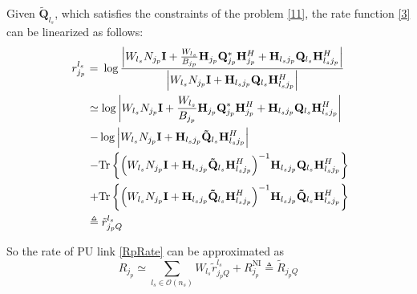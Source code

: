\documentclass[12pt,onecolumn,tworows]{IEEEtran}
\begin{document}
Given $\tilde{\mathbf{Q}}_{l_s}$, which satisfies the constraints of the problem \eqref{11},  the rate function \eqref{3} can be linearized as follows\cite{RuiZhangICL2012}:
 \begin{equation}\label{4}
\begin{gathered}
  {\text{ }}{r_{{j_p}}^{l_s}}{\text{ = }}\log \frac{{\left| {{{W_{{l_s}}}{N_{{j_p}}}}{\mathbf{I}} + {\frac{{{W_{{l_s}}}}}{{{B_{{j_p}}}}}} {{\mathbf{H}}_{{j_p}}}{\mathbf{Q}}_{{j_p}}^*{\mathbf{H}}_{{j_p}}^H + {{\mathbf{H}}_{{l_s}{j_p}}}{{\mathbf{Q}}_{{l_s}}}{\mathbf{H}}_{{l_s}{j_p}}^H} \right|}}{{\left| {{{W_{{l_s}}}{N_{{j_p}}}}{\mathbf{I}} + {{\mathbf{H}}_{{l_s}{j_p}}}{{\mathbf{Q}}_{{l_s}}}{\mathbf{H}}_{{l_s}{j_p}}^H} \right|}} \hfill \\
  \;\;\;\;\;\;\; \simeq \log \left| {{{W_{{l_s}}}{N_{{j_p}}}}{\mathbf{I}} + {\frac{{{W_{{l_s}}}}}{{{B_{{j_p}}}}}} {{\mathbf{H}}_{{j_p}}}{\mathbf{Q}}_{{j_p}}^*{\mathbf{H}}_{{j_p}}^H + {{\mathbf{H}}_{{l_s}{j_p}}}{{\mathbf{Q}}_{{l_s}}}{\mathbf{H}}_{{l_s}{j_p}}^H} \right| \hfill \\
  \;\;\;\;\;\;\; - \log \left| {{{W_{{l_s}}}{N_{{j_p}}}}{\mathbf{I}} + {{\mathbf{H}}_{{l_s}{j_p}}}{{{\mathbf{\tilde Q}}}_{{l_s}}}{\mathbf{H}}_{{l_s}{j_p}}^H} \right| \hfill \\
  \;\;\;\;\;\;\; - \text{Tr}\left\{ {{{\left( {{{W_{{l_s}}}{N_{{j_p}}}}{\mathbf{I}} + {{\mathbf{H}}_{{l_s}{j_p}}}{{{\mathbf{\tilde Q}}}_{{l_s}}}{\mathbf{H}}_{{l_s}{j_p}}^H} \right)}^{ - 1}}{{\mathbf{H}}_{{l_s}{j_p}}}{{\mathbf{Q}}_{{l_s}}}{\mathbf{H}}_{{l_s}{j_p}}^H} \right\} \hfill \\
  \;\;\;\;\;\;\; + \text{Tr}\left\{ {{{\left( {{{W_{{l_s}}}{N_{{j_p}}}}{\mathbf{I}} + {{\mathbf{H}}_{{l_s}{j_p}}}{{{\mathbf{\tilde Q}}}_{{l_s}}}{\mathbf{H}}_{{l_s}{j_p}}^H} \right)}^{ - 1}}{{\mathbf{H}}_{{l_s}{j_p}}}{{{\mathbf{\tilde Q}}}_{{l_s}}}{\mathbf{H}}_{{l_s}{j_p}}^H} \right\} \hfill \\
  \;\;\;\;\;\;\;\triangleq \tilde{r}_{{j_pQ}}^{l_s} \hfill \\
\end{gathered}
\end{equation}

So the rate of PU link \eqref{RpRate} can be approximated as
\begin{equation}\label{LinearizedRate}
R_{j_p}\simeq \sum \limits_{l_s \in \mathcal{O}(n_s)}W_{{l_s}}\tilde{r}_{j_pQ}^{l_s}+R_{j_p}^{\text{NI}}\triangleq \tilde{R}_{j_pQ}
\end{equation}
\end{document}
